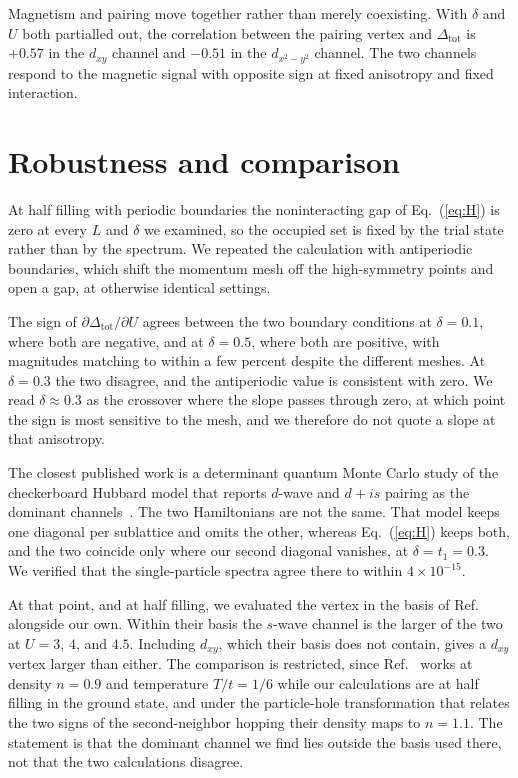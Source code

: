 \documentclass[aps,prb,reprint,superscriptaddress,amsmath,amssymb,floatfix]{revtex4-2}
\begin{document}
Magnetism and pairing move together rather than merely coexisting. With $\delta$
and $U$ both partialled out, the correlation between the pairing vertex and
$\Delta_{\mathrm{tot}}$ is $+0.57$ in the $d_{xy}$ channel and $-0.51$ in the
$d_{x^2-y^2}$ channel. The two channels respond to the magnetic signal with
opposite sign at fixed anisotropy and fixed interaction.

\section{Robustness and comparison}

At half filling with periodic boundaries the noninteracting gap of
Eq.~(\ref{eq:H}) is zero at every $L$ and $\delta$ we examined, so the occupied
set is fixed by the trial state rather than by the spectrum. We repeated the
calculation with antiperiodic boundaries, which shift the momentum mesh off the
high-symmetry points and open a gap, at otherwise identical settings.

The sign of $\partial \Delta_{\mathrm{tot}} / \partial U$ agrees between the two
boundary conditions at $\delta = 0.1$, where both are negative, and at
$\delta = 0.5$, where both are positive, with magnitudes matching to within a
few percent despite the different meshes. At $\delta = 0.3$ the two disagree,
and the antiperiodic value is consistent with zero. We read $\delta \approx 0.3$
as the crossover where the slope passes through zero, at which point the sign is
most sensitive to the mesh, and we therefore do not quote a slope at that
anisotropy.

The closest published work is a determinant quantum Monte Carlo study of the
checkerboard Hubbard model that reports $d$-wave and $d + is$ pairing as the
dominant channels~\cite{Pan2024}. The two Hamiltonians are not the same. That
model keeps one diagonal per sublattice and omits the other, whereas
Eq.~(\ref{eq:H}) keeps both, and the two coincide only where our second diagonal
vanishes, at $\delta = t_1 = 0.3$. We verified that the single-particle spectra
agree there to within $4\times10^{-15}$.

At that point, and at half filling, we evaluated the vertex in the basis of
Ref.~\cite{Pan2024} alongside our own. Within their basis the $s$-wave channel
is the larger of the two at $U = 3$, $4$, and $4.5$. Including $d_{xy}$, which
their basis does not contain, gives a $d_{xy}$ vertex larger than either.
The comparison is restricted, since Ref.~\cite{Pan2024} works at density
$n = 0.9$ and temperature $T/t = 1/6$ while our calculations are at half filling
in the ground state, and under the particle-hole transformation that relates the
two signs of the second-neighbor hopping their density maps to $n = 1.1$. The
statement is that the dominant channel we find lies outside the basis used
there, not that the two calculations disagree.
\end{document}
